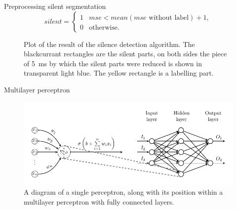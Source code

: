 \documentclass[10pt]{beamer}
\begin{document}
\begin{frame}{Preprocessing silent segmentation}
\begin{equation}\label{eq:silent_detection_1}
silent = \begin{cases} 1 & mse < mean(mse \text{ without label})+1, \\ 0 & \text{otherwise}. \end{cases}
\end{equation}
\begin{figure}
\centering
    
    \caption{Plot of the result of the silence detection algorithm. The blackcurrant rectangles are the silent parts, on both sides the piece of \SI{5}{\milli\second} by which the silent parts were reduced is shown in transparent light blue. The yellow rectangle is a labelling part.}
    \label{fig:silent_detection_sample1}
\end{figure}
\end{frame}

\begin{frame}{Multilayer perceptron}
\begin{figure}[H]
\centering
  \includegraphics[width=1\textwidth]{image/mlp_schema.pdf}
  \caption{A diagram of a single perceptron, along with its position within a multilayer perceptron with fully connected layers.}
  \label{fig:mlp_schema}
\end{figure}
\end{frame}
\end{document}
